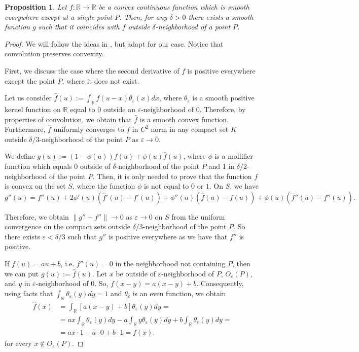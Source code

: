 \documentclass[12pt]{article}
\numberwithin{equation}{section}
\newtheorem{prop}[lem]{Proposition}
\theoremstyle{definition}
\newcommand{\eps}{\varepsilon}
\begin{document}
\begin{prop}\label{prop:smoothing}
Let $f:\mathbb R\rightarrow \mathbb R$ be a convex continuous function which is smooth everywhere except at a single point $P$. Then, for any $\delta>0$ there exists a smooth function $g$ such that it coincides with $f$ outside $\delta$-neighborhood of a point $P$.
\end{prop}
\begin{proof}
We will follow the ideas in \cite{G02}, but adapt for our case. Notice that convolution preserves convexity.

First, we discuss the case where the second derivative of $f$ is positive everywhere except the point $P$, where it does not exist.

Let us consider $\hat f(u):=\int_{\mathbb R}f(u-x)\theta_{\eps}(x)dx$, where $\theta_{\eps}$ is a smooth positive kernel function on $\mathbb R$ equal to 0 outside an $\eps$-neighborhood of 0. Therefore, by properties of convolution, we obtain that $\hat f$ is a smooth convex function. Furthermore, $\hat f$ uniformly converges to $f$ in $C^2$ norm in any compact set $K$ outside $\delta/3$-neighborhood of the point $P$ as $\eps\rightarrow 0$.

We define $g(u):=(1-\phi(u))f(u)+\phi(u)\hat f(u)$, where $\phi$ is a mollifier function which equals 0 outside of $\delta$-neighborhood of the point $P$ and 1 in $\delta/2$-neighborhood of the point $P$. Then, it is only needed to prove that the function $f$ is convex on the set $S$, where the function $\phi$ is not equal to $0$ or $1$. On $S$, we have
    $$g''(u)=f''(u)+2\phi'(u)(\hat f'(u)-f'(u))+\phi''(u)(\hat f(u)-f(u))+\phi(u)(\hat f''(u)-f''(u)).$$

    Therefore, we obtain $\|g''-f''\|\rightarrow 0$ as $\eps\rightarrow 0$ on $S$ from the uniform convergence on the compact sets outside $\delta/3$-neighborhood of the point $P$. So there exists $\eps<\delta/3$ such that $g''$ is positive everywhere as we have that $f''$ is positive.
		
    If $f(u)=au+b$, i.e. $f''(u)=0$ in the neighborhood not containing $P$, then we can put $g(u):=\hat f(u)$. Let $x$ be outside of $\eps$-neighborhood of $P$, $O_{\eps}(P)$, and $y$ in $\eps$-neighborhood of 0. So, $f(x-y)=a(x-y)+b$. Consequently, using facts that $\int_{\mathbb R}\theta_{\eps}(y)dy=1$ and $\theta_{\eps}$ is an even function, we obtain
    \begin{align*}
    \hat f(x) &= \int_{\mathbb R}[a(x-y)+b]\theta_{\eps}(y)dy = \\
    &= ax\int_{\mathbb R}\theta_{\eps}(y)dy-a\int_{\mathbb R}y\theta_{\eps}(y)dy+b\int_{\mathbb R}\theta_{\eps}(y)dy = \\
    &=ax\cdot 1-a\cdot 0+b\cdot 1 = f(x).
    \end{align*}
    for every $x\not\in O_{\eps}(P)$.
\end{proof}
\end{document}
